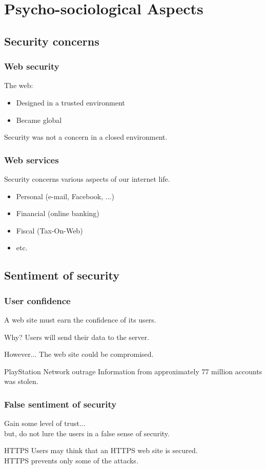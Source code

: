 \section{Psycho-sociological Aspects}

\subsection{Security concerns}

\begin{frame}
\frametitle{Web security}
The web:
\begin{itemize}
\item Designed in a trusted environment
\item Became global
\end{itemize}
Security was not a concern in a closed environment.
\end{frame}

\begin{frame}
\frametitle{Web services}
Security concerns various aspects of our internet life.
\begin{itemize}
\item Personal (e-mail, Facebook, ...)
\item Financial (online banking)
\item Fiscal (Tax-On-Web)
\item etc.
\end{itemize}
\end{frame}

\subsection{Sentiment of security}

\begin{frame}
\frametitle{User confidence}
A web site must earn the confidence of its users.
\begin{block}{Why?}
Users will send their data to the server.
\end{block}
\begin{block}{However...}
The web site could be compromised.
\end{block}
\begin{exampleblock}{PlayStation Network outrage}
Information from approximately 77 million accounts was stolen.
\end{exampleblock}
\end{frame}

\begin{frame}
\frametitle{False sentiment of security}
Gain some level of trust...
\\ but, do not lure the users in a false sense of security.
\begin{exampleblock}{HTTPS}
Users may think that an HTTPS web site is secured.
\\ HTTPS prevents only some of the attacks.
\end{exampleblock}
\end{frame}

